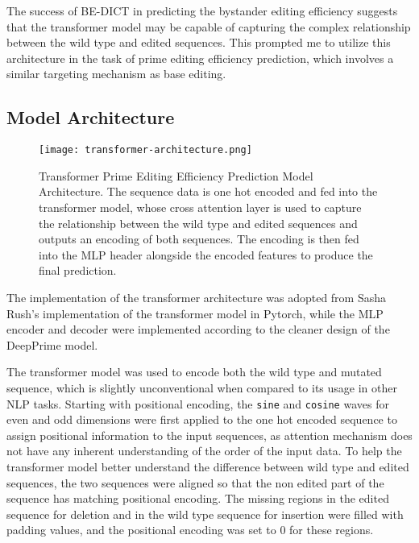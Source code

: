 The success of BE-DICT in predicting the bystander editing efficiency suggests that the transformer model may be capable of capturing the complex relationship between the wild type and edited sequences. This prompted me to utilize this architecture in the task of prime editing efficiency prediction, which involves a similar targeting mechanism as base editing.

\subsection{Model Architecture}

\begin{figure}
    \centering
    \texttt{[image: transformer-architecture.png]}
    \caption[Transformer Model Architecture]{Transformer Prime Editing Efficiency Prediction Model Architecture. The sequence data is one hot encoded and fed into the transformer model, whose cross attention layer is used to capture the relationship between the wild type and edited sequences and outputs an encoding of both sequences. The encoding is then fed into the MLP header alongside the encoded features to produce the final prediction.}
    \label{fig:transformer-model}
\end{figure}

The implementation of the transformer architecture was adopted from Sasha Rush's implementation of the transformer model in Pytorch\cite{AnnotatedTransformer}, while the MLP encoder and decoder were implemented according to the cleaner design of the DeepPrime model\cite{yuPredictionEfficienciesDiverse2023}.

The transformer model was used to encode both the wild type and mutated sequence, which is slightly unconventional when compared to its usage in other NLP tasks. Starting with positional encoding, the \verb|sine| and \verb|cosine| waves for even and odd dimensions were first applied to the one hot encoded sequence to assign positional information to the input sequences, as attention mechanism does not have any inherent understanding of the order of the input data. 
To help the transformer model better understand the difference between wild type and edited sequences, the two sequences were aligned so that the non edited part of the sequence has matching positional encoding. The missing regions in the edited sequence for deletion and in the wild type sequence for insertion were filled with padding values, and the positional encoding was set to 0 for these regions.

